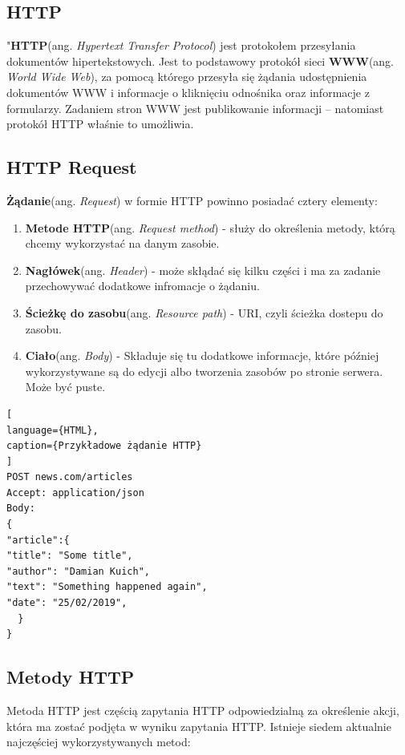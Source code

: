 \documentclass[oneside,polski,logo,indent]{amuthesis}
\begin{document}
\begin{center}
\subsection{HTTP}
\end{center}

"\textbf{HTTP}(ang. \emph{Hypertext Transfer Protocol}) jest protokołem przesyłania dokumentów hipertekstowych. Jest to podstawowy protokół sieci \textbf{WWW}(ang. \emph{World Wide Web}), za pomocą którego przesyła się żądania udostępnienia dokumentów WWW i informacje o kliknięciu odnośnika oraz informacje z formularzy. Zadaniem stron WWW jest publikowanie informacji – natomiast protokół HTTP właśnie to umożliwia.

\begin{center}
\subsection{HTTP Request}
\end{center}
\textbf{Żądanie}(ang. \emph{Request}) w formie HTTP powinno posiadać cztery elementy:
\begin{enumerate}
\item \textbf{Metode HTTP}(ang. \emph{Request method}) - służy do określenia metody, którą chcemy wykorzystać na danym zasobie.
\item \textbf{Nagłówek}(ang. \emph{Header}) - może skłądać się kilku części i ma za zadanie przechowywać dodatkowe infromacje o żądaniu.
\item \textbf{Ścieżkę do zasobu}(ang. \emph{Resource path}) - URI, czyli ścieżka dostepu do zasobu.
\item \textbf{Ciało}(ang. \emph{Body}) - Składuje się tu dodatkowe informacje, które później wykorzystywane są do edycji albo tworzenia zasobów po stronie serwera. Może być puste.
\end{enumerate}


\begin{lstlisting}[
language={HTML},
caption={Przykładowe żądanie HTTP}
]
POST news.com/articles
Accept: application/json
Body:
{
"article":{
"title": "Some title",
"author": "Damian Kuich",
"text": "Something happened again",
"date": "25/02/2019",
  }
}
\end{lstlisting}

\begin{center}
\subsection{Metody HTTP}
\end{center}
Metoda HTTP jest częścią zapytania HTTP odpowiedzialną za określenie akcji, która ma zostać podjęta w wyniku zapytania HTTP. Istnieje siedem aktualnie najczęściej wykorzystywanych metod:
\end{document}
